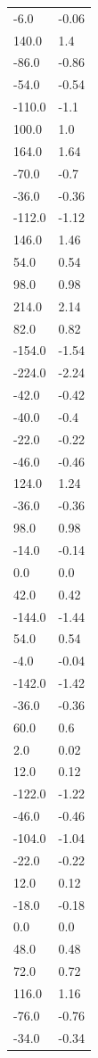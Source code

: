 \begin{longtable}{ll}
-6.0 & -0.06 \\
140.0 & 1.4 \\
-86.0 & -0.86 \\
-54.0 & -0.54 \\
-110.0 & -1.1 \\
100.0 & 1.0 \\
164.0 & 1.64 \\
-70.0 & -0.7 \\
-36.0 & -0.36 \\
-112.0 & -1.12 \\
146.0 & 1.46 \\
54.0 & 0.54 \\
98.0 & 0.98 \\
214.0 & 2.14 \\
82.0 & 0.82 \\
-154.0 & -1.54 \\
-224.0 & -2.24 \\
-42.0 & -0.42 \\
-40.0 & -0.4 \\
-22.0 & -0.22 \\
-46.0 & -0.46 \\
124.0 & 1.24 \\
-36.0 & -0.36 \\
98.0 & 0.98 \\
-14.0 & -0.14 \\
0.0 & 0.0 \\
42.0 & 0.42 \\
-144.0 & -1.44 \\
54.0 & 0.54 \\
-4.0 & -0.04 \\
-142.0 & -1.42 \\
-36.0 & -0.36 \\
60.0 & 0.6 \\
2.0 & 0.02 \\
12.0 & 0.12 \\
-122.0 & -1.22 \\
-46.0 & -0.46 \\
-104.0 & -1.04 \\
-22.0 & -0.22 \\
12.0 & 0.12 \\
-18.0 & -0.18 \\
0.0 & 0.0 \\
48.0 & 0.48 \\
72.0 & 0.72 \\
116.0 & 1.16 \\
-76.0 & -0.76 \\
-34.0 & -0.34 \\

\end{longtable}
